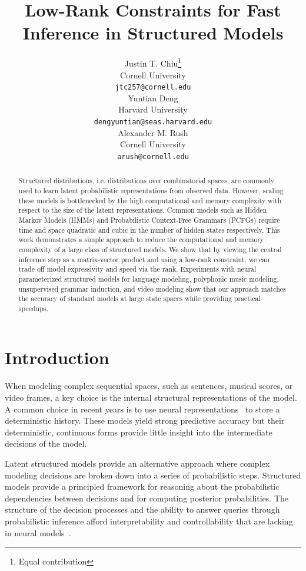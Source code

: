\documentclass{article}
\title{Low-Rank Constraints for Fast Inference in Structured Models}
\author{%
  Justin T. Chiu\thanks{Equal contribution}\\
  Cornell University \\
  \texttt{jtc257@cornell.edu} \\
  \And
  Yuntian Deng\footnotemark[1] \\
  Harvard University \\
  \texttt{dengyuntian@seas.harvard.edu} \\
  \AND
  Alexander M. Rush \\
  Cornell University \\
  \texttt{arush@cornell.edu} \\
}
\begin{document}
\maketitle

\begin{abstract}
Structured distributions, i.e. distributions over combinatorial spaces, are commonly used to learn latent probabilistic representations from observed data. However, scaling these models is bottlenecked by the high computational and memory complexity with respect to the size of the latent representations. Common models such as Hidden Markov Models (HMMs) and Probabilistic Context-Free Grammars (PCFGs) require time and space quadratic and cubic in the number of hidden states respectively. This work demonstrates a  simple approach to reduce the computational and memory complexity of a large class of structured models. We show that by viewing the central inference step as a matrix-vector product and using a low-rank constraint, we can trade off model expressivity and speed via the rank.  Experiments with neural parameterized structured models for language modeling, polyphonic music modeling, unsupervised grammar induction, and video modeling show that our approach matches the accuracy of standard models at large state spaces while providing practical speedups.
\end{abstract}

\section{Introduction}


When modeling complex sequential spaces, such as sentences, musical scores, or video frames,
a key choice is the internal structural representations of the model. A common choice in recent years is to use neural representations~\citep{nplm,mikolov-2011,gpt3,polyphonic,music-trans,video} to store a deterministic history. These models yield strong predictive accuracy but their deterministic, continuous forms provide little insight into the intermediate decisions of the model.

Latent structured models provide an alternative approach where complex modeling decisions are broken down into a series of probabilistic steps. Structured models provide a principled framework for reasoning about the probabilistic dependencies between decisions and for computing posterior probabilities. 
The structure of the decision processes and the ability to answer queries through probabilistic inference afford interpretability and controllability that are lacking in neural models~\citep{pgm,levine2018reinforcement}.
 
\end{document}
